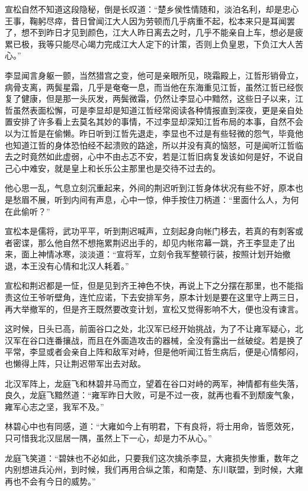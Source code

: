 宣松自然不知道这段隐秘，倒是长叹道：“楚乡侯性情随和，淡泊名利，却是忠心王事，鞠躬尽瘁，昔日曾闻江大人因为劳顿而几乎病重不起，松本来只是耳闻罢了，想不到昨日才见到颜色，江大人昨日离去之时，几乎不能亲自上车，想必是疲累已极，我等只能尽心竭力完成江大人定下的计策，否则上负皇恩，下负江大人苦心。”

李显闻言身躯一颤，当然猎宫之变，他可是亲眼所见，晓霜殿上，江哲形销骨立，病骨支离，两鬓星霜，几乎是奄奄一息，而当他在东海重见江哲，虽然江哲已经恢复了健康，但是那一头灰发，两鬓微霜，仍然让李显心中黯然，这些日子以来，江哲虽然表面松懈，可是李显却是知道江哲经常阅读各种情报直到深夜，更是亲自处置安排了许多看上去莫名其妙的事情，不过李显却深知江哲布局的本事，自然不会以为江哲是在偷懒。昨日听到江哲先退走，李显也不过是有些轻微的怨气，毕竟他也知道江哲的身体恐怕经不起溃败的路途，所以并没有真的恼怒，可是闻听江哲临去之时竟然如此虚弱，心中不由忐忑不安，若是江哲旧病复发该如何是好，不说自己心中难安，就是皇上和长乐公主那里也是交待不过去的。

他心思一乱，气息立刻沉重起来，外间的荆迟听到江哲身体状况有些不好，原本也是愁眉不展，听到内间有声息，心中一惊，伸手按住刀柄道：“里面什么人，为何在此偷听？”

宣松本是儒将，武功平平，听到荆迟喊声，立刻起身向帐门移去，若真的有刺客或者密谍，那么他自然不想拖累荆迟出手的，却见内帐帘幕一跳，齐王李显走了出来，面上神情冰寒，淡淡道：“宣将军，立刻令我军整顿行装，按照计划开始撤退，本王没有心情和北汉人耗着。”

宣松和荆迟都是一怔，但是见到齐王神色不快，再说上下之分摆在那里，也不能指责这位王爷听壁角，连忙应诺，下去安排军务，原本计划是要在这里守上两三日，再大举撤军的，但是齐王既然要改变计划，宣松又觉得影响不大，便也没有谏言。

这时候，日头已高，前面谷口之处，北汉军已经开始挑战，为了不让雍军疑心，北汉军在谷口连番攘战，而且在外面造攻击的器械，全没有露出一丝破绽。若是换了平常，李显或者会亲自上阵和敌军对峙，但是他听闻江哲生病后，便是心情郁闷，也懒得上阵，只让荆迟带军出去对敌。

北汉军阵上，龙庭飞和林碧并马而立，望着在谷口对峙的两军，神情都有些失落，良久，龙庭飞黯然道：“雍军昨日大败，可是不过一夜，就再也看不到颓废气象，雍军心志之坚，我军不及。”

林碧心中也有同感，道：“大雍如今上有明君，下有良将，将士用命，皆愿效死，只可惜我北汉屈居一隅，虽然上下一心，却是力不从心。”

龙庭飞笑道：“碧妹也不必如此，只要我们这次擒杀李显，大雍损失惨重，数年之内别想进兵沁州，到时候，我们再用合纵之策，和南楚、东川联盟，到时候，大雍再也不会有今日的威势。”

